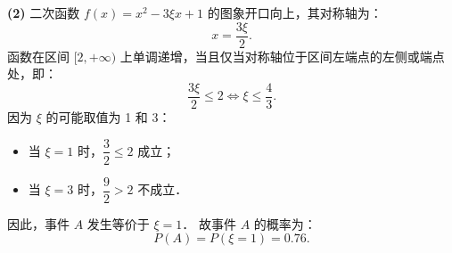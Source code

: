 \begin{answer}
\textbf{(2)}
二次函数 $f(x) = x^2 - 3\xi x + 1$ 的图象开口向上，其对称轴为：
\nopagebreak[4]
\[
x = \frac{3\xi}{2}.
\]
函数在区间 $[2, +\infty)$ 上单调递增，当且仅当对称轴位于区间左端点的左侧或端点处，即：
\nopagebreak[4]
\[
\frac{3\xi}{2} \leqslant 2 \iff \xi \leqslant \frac{4}{3}.
\]
因为 $\xi$ 的可能取值为 1 和 3：
\begin{itemize}
\item 当 $\xi = 1$ 时，$\dfrac{3}{2} \leqslant 2$ 成立；
\item 当 $\xi = 3$ 时，$\dfrac{9}{2} > 2$ 不成立．
\end{itemize}

因此，事件 $A$ 发生等价于 $\xi = 1$．
故事件 $A$ 的概率为：
\nopagebreak[4]
\[
P(A) = P(\xi = 1) = 0.76.
\]



\end{answer}
